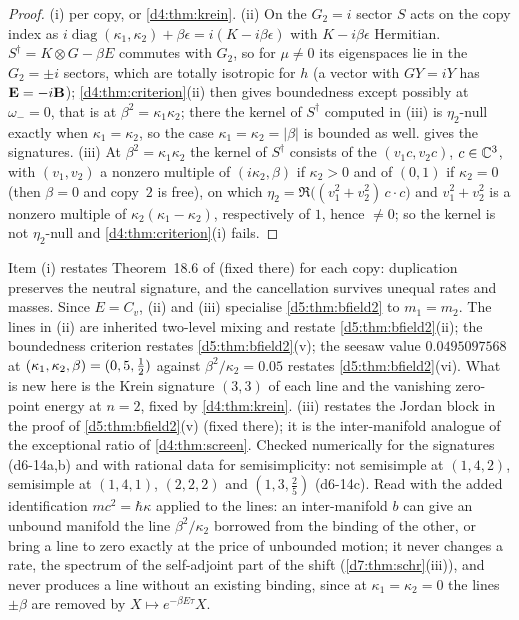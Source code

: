 \begin{proof}
(i)  per copy, or \cref{d4:thm:krein}. (ii) On the $G_2=i$ sector $S$ acts on the copy index as
$i\operatorname{diag}(\kappa_1,\kappa_2)+\beta\epsilon=i(K-i\beta\epsilon)$ with $K-i\beta\epsilon$ Hermitian. $S^\dagger=K\otimes G-\beta E$ commutes with
$G_2$, so for $\mu\neq0$ its eigenspaces lie in the $G_2=\pm i$ sectors, which are totally isotropic for $h$ (a vector with $GY=iY$ has
$\mathbf E=-i\mathbf B$); \cref{d4:thm:criterion}(ii) then gives boundedness except possibly at $\omega_-=0$, that is at $\beta^2=\kappa_1\kappa_2$; there the kernel of $S^\dagger$ computed in (iii) is $\eta_2$-null exactly when $\kappa_1=\kappa_2$, so the case $\kappa_1=\kappa_2=|\beta|$ is bounded as well.  gives the signatures. (iii) At
$\beta^2=\kappa_1\kappa_2$ the kernel of $S^\dagger$ consists of the $(v_1c,v_2c)$, $c\in\mathbb{C}^3$, with $(v_1,v_2)$ a nonzero multiple of $(i\kappa_2,\beta)$ if $\kappa_2>0$ and of $(0,1)$ if $\kappa_2=0$ (then $\beta=0$ and copy~$2$ is free), on which
$\eta_2=\Re\bigl((v_1^2+v_2^2)\,c\cdot c\bigr)$ and $v_1^2+v_2^2$ is a nonzero multiple of $\kappa_2(\kappa_1-\kappa_2)$, respectively of $1$, hence $\neq0$; so the kernel is not $\eta_2$-null and
\cref{d4:thm:criterion}(i) fails.
\end{proof}

Item (i) restates Theorem~18.6 of \cite{ES17} (fixed there) for each copy: duplication preserves the neutral signature, and the cancellation
survives unequal rates and masses. Since $E=C_v$, (ii) and (iii) specialise \cref{d5:thm:bfield2} to $m_1=m_2$. The lines in (ii) are inherited two-level mixing and restate
\cref{d5:thm:bfield2}(ii); the boundedness criterion restates \cref{d5:thm:bfield2}(v); the seesaw value $0.0495097568$ at
$(\kappa_1,\kappa_2,\beta)=(0,5,\tfrac12)$ against $\beta^2/\kappa_2=0.05$ restates \cref{d5:thm:bfield2}(vi). What is new here is the Krein signature
$(3,3)$ of each line and the vanishing zero-point energy at $n=2$, fixed by \cref{d4:thm:krein}. (iii) restates the Jordan block in the proof
of \cref{d5:thm:bfield2}(v) (fixed there); it is the inter-manifold analogue of the exceptional ratio of \cref{d4:thm:screen}. Checked numerically for the signatures (d6-14a,b) and with rational
data for semisimplicity: not semisimple at $(1,4,2)$, semisimple at $(1,4,1)$, $(2,2,2)$ and $(1,3,\tfrac25)$ (d6-14c). Read with the added
identification $mc^2=\hbar\kappa$ applied to the lines: an inter-manifold $b$ can give an unbound manifold the line $\beta^2/\kappa_2$ borrowed from the
binding of the other, or bring a line to zero exactly at the price of unbounded motion; it never changes a rate, the spectrum of the
self-adjoint part of the shift (\cref{d7:thm:schr}(iii)), and never produces a line without an existing binding, since at
$\kappa_1=\kappa_2=0$ the lines $\pm\beta$ are removed by $X\mapsto e^{-\beta E\tau}X$.

